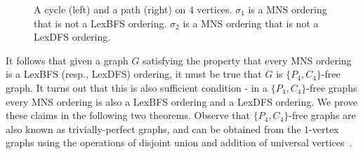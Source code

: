 \documentclass{svproc}
\begin{document}
\begin{figure}[H]
\centering
{}
\caption[MNS orderigns that are not LexBFS or LexDFS.]{A cycle (left) and a path (right) on $4$ vertices. $\sigma_1$ is a MNS ordering that is not a LexBFS ordering. $\sigma_2$ is a MNS ordering that is not a LexDFS ordering.}
\label{fig:forbiddengraphs-p4c4}
\end{figure}

It follows that given a graph $G$ satisfying the property that every MNS ordering is a LexBFS (resp., LexDFS) ordering, it must be true that $G$ is $\{P_4,C_4\}$-free graph. It turns out that this is also sufficient condition - in a $\{P_4,C_4\}$-free graphs every MNS ordering is also a LexBFS ordering and a LexDFS ordering. We prove these claims in the following two theorems. Observe that $\{P_4,C_4\}$-free graphs are also known as trivially-perfect graphs, and can be obtained from the $1$-vertex graphs using the operations of disjoint union and addition of universal vertices~\cite{golumbic1978trivially}.
\end{document}
